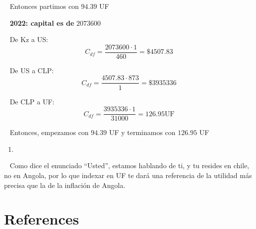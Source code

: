 \documentclass[
  letterpaper,
  DIV=11,
  numbers=noendperiod]{scrreport}
\providecommand{\tightlist}{%
  \setlength{\itemsep}{0pt}\setlength{\parskip}{0pt}}\usepackage{longtable,booktabs,array}
\newlength{\cslhangindent}
\newlength{\cslentryspacingunit} %
\newenvironment{CSLReferences}[2] %
 {%
  \setlength{\parindent}{0pt}
  \ifodd #1
  \let\oldpar\par
  \def\par{\hangindent=\cslhangindent\oldpar}
  \fi
  \setlength{\parskip}{#2\cslentryspacingunit}
 }%
 {}
\begin{document}
~ Entonces partimos con \(94.39\) UF

~ \textbf{2022: capital es de} \(2073600\)

~ De Kz a US: \[
C_{df}=\frac{2073600\cdot 1}{460}=\$4507.83
\]

~ De US a CLP: \[
C_{df}=\frac{4507.83\cdot 873}{1}=\$3935336
\]

~ De CLP a UF: \[
C_{df}=\frac{3935336\cdot 1}{31000}=126.95\text{UF}
\]

~ Entonces, empezamos con \(94.39\) UF y terminamos con \(126.95\) UF

\begin{enumerate}
\def\labelenumi{\arabic{enumi})}
\setcounter{enumi}{3}
\tightlist
\item
\end{enumerate}

~ Como dice el enunciado ``Usted'', estamos hablando de ti, y tu resides
en chile, no en Angola, por lo que indexar en UF te dará una referencia
de la utilidad más precisa que la de la inflación de Angola.


\hypertarget{references}{%
\chapter*{References}\label{references}}


\hypertarget{refs}{}
\begin{CSLReferences}{0}{0}
\end{CSLReferences}
\end{document}

